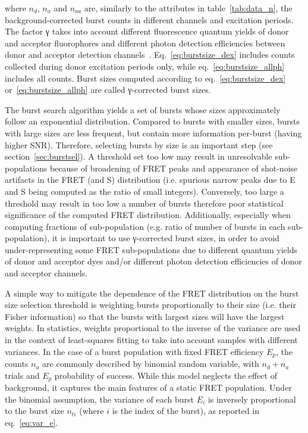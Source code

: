 \noindent where $n_d$, $n_a$ and $n_{aa}$ are, similarly to the attributes
in table~\ref{tab:data_n}, the background-corrected
burst counts in different channels and excitation periods.
The factor γ takes into account
different fluorescence quantum yields of donor and acceptor fluorophores and different
photon detection efficiencies between donor and acceptor detection
channels~\cite{Deniz_1999,Lee_2005}.
Eq.~\ref{eq:burstsize_dex} includes counts collected during donor excitation periods only,
while eq.~\ref{eq:burstsize_allph} includes all counts.
Burst sizes computed according to eq.~\ref{eq:burstsize_dex}
or~\ref{eq:burstsize_allph} are called γ-corrected burst sizes.

The burst search algorithm yields a set of bursts whose sizes
approximately follow an exponential distribution.
Compared to bursts with smaller sizes, bursts with large sizes are less frequent, 
but contain more information per-burst (having higher SNR).
Therefore, selecting bursts by size is an important step (see section~\ref{sec:burstsel}).
A threshold set too low may result in unresolvable sub-populations
because of broadening of FRET peaks and appearance of shot-noise artifacts
in the FRET (and S) distribution (i.e. spurious narrow peaks due to E and S being
computed as the ratio of small integers).
Conversely, too large a threshold may result in too low a number of bursts
therefore poor statistical significance of the computed FRET distribution.
Additionally, especially when computing fractions of sub-population 
(e.g. ratio of number of bursts in each sub-population),
it is important to use γ-corrected burst sizes,
in order to avoid under-representing some FRET sub-populations
due to different quantum yields of donor and acceptor dyes and/or
different photon detection efficiencies of donor and acceptor channels.

A simple way to mitigate the dependence of the FRET distribution on 
the burst size selection threshold is weighting bursts proportionally to their size 
(i.e. their Fisher information)
so that the bursts with largest sizes will have the largest weights.
In statistics, weights proportional to the inverse of the variance are used 
in the context of least-squares fitting to take into account samples
with different variances. In the case of a burst population with fixed FRET efficiency $E_p$, 
the counts $n_a$ are commonly described by binomial random variable, with $n_d + n_a$ trials 
and $E_p$ probability of success. While this model neglects the effect of background, it captures
the main features of a static FRET population. Under the binomial assumption,
the variance of each burst $E_i$ is inversely proportional to the burst size $n_{ti}$ 
(where $i$ is the index of the burst),
as reported in eq.~\ref{eq:var_e}.


